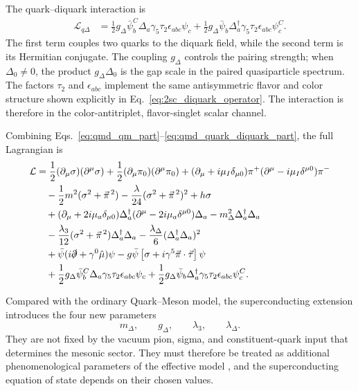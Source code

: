 The quark--diquark interaction is
\begin{align}
\mathcal{L}_{q\Delta}
&=
\frac{1}{2}g_\Delta
\bar{\psi}_b^C
\Delta_a\gamma_5\tau_2\epsilon_{abc}\psi_c
+
\frac{1}{2}g_\Delta
\bar{\psi}_b
\Delta_a^\dagger\gamma_5\tau_2\epsilon_{abc}\psi_c^C .
\label{eq:qmd_quark_diquark_part}
\end{align}
The first term couples two quarks to the diquark field, while the second
term is its Hermitian conjugate. The coupling \(g_\Delta\) controls the
pairing strength; when \(\Delta_0\neq0\), the product
\(g_\Delta\Delta_0\) is the gap scale in the paired quasiparticle
spectrum. The factors \(\tau_2\) and \(\epsilon_{abc}\) implement the same
antisymmetric flavor and color structure shown explicitly in
Eq.~\eqref{eq:2sc_diquark_operator}. The interaction is therefore in the
color-antitriplet, flavor-singlet scalar channel.

Combining Eqs.~\eqref{eq:qmd_qm_part}--\eqref{eq:qmd_quark_diquark_part},
the full Lagrangian is
\begin{align}
\mathcal{L}
&=
\frac{1}{2}(\partial_\mu\sigma)(\partial^\mu\sigma)
+
\frac{1}{2}(\partial_\mu\pi_0)(\partial^\mu\pi_0)
+
(\partial_\mu+i\mu_I\delta_{\mu0})\pi^+
(\partial^\mu-i\mu_I\delta^{\mu0})\pi^-
\nonumber \\
&\quad
-
\frac{1}{2}m^2(\sigma^2+\vec{\pi}^{\,2})
-
\frac{\lambda}{24}(\sigma^2+\vec{\pi}^{\,2})^2
+
h\sigma
\nonumber \\
&\quad
+
(\partial_\mu+2i\mu_a\delta_{\mu0})\Delta_a^\dagger
(\partial^\mu-2i\mu_a\delta^{\mu0})\Delta_a
-
m_\Delta^2\Delta_a^\dagger\Delta_a
\nonumber \\
&\quad
-
\frac{\lambda_3}{12}
(\sigma^2+\vec{\pi}^{\,2})\Delta_a^\dagger\Delta_a
-
\frac{\lambda_\Delta}{6}
(\Delta_a^\dagger\Delta_a)^2
\nonumber \\
&\quad
+
\bar{\psi}(i\slashed{\partial}+\gamma^0\hat{\mu})\psi
-
g\bar{\psi}
\left[
\sigma+i\gamma^5\vec{\pi}\cdot\vec{\tau}
\right]\psi
\nonumber \\
&\quad
+
\frac{1}{2}g_\Delta
\bar{\psi}_b^C
\Delta_a\gamma_5\tau_2\epsilon_{abc}\psi_c
+
\frac{1}{2}g_\Delta
\bar{\psi}_b
\Delta_a^\dagger\gamma_5\tau_2\epsilon_{abc}\psi_c^C .
\label{eq:qmd_full_lagrangian}
\end{align}

Compared with the ordinary Quark--Meson model, the superconducting
extension introduces the four new parameters
\begin{equation}
m_\Delta,\qquad
g_\Delta,\qquad
\lambda_3,\qquad
\lambda_\Delta .
\end{equation}
They are not fixed by the vacuum pion, sigma, and constituent-quark input
that determines the mesonic sector. They must therefore be treated as
additional phenomenological parameters of the effective model
\cite{Andersen2024}, and the superconducting equation of state depends on
their chosen values.

